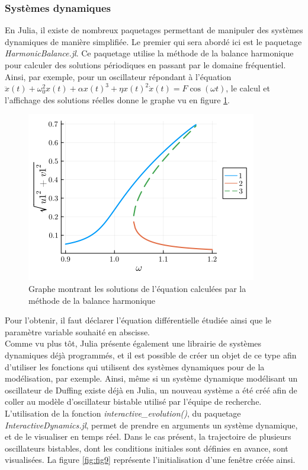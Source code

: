\documentclass[a4paper, french, 12pt, titlepage]{article}
\begin{document}
\subsubsection{Systèmes dynamiques}

En Julia, il existe de nombreux paquetages permettant de manipuler des systèmes dynamiques de manière simplifiée. 
Le premier qui sera abordé ici est le paquetage \emph{HarmonicBalance.jl}.
 Ce paquetage utilise la méthode de la balance harmonique pour calculer des solutions périodiques en passant par le domaine fréquentiel.
  Ainsi, par exemple, pour un oscillateur répondant à l'équation $\ddot x(t) + \omega_0^2 x(t) + \alpha x(t)^3 + \eta x(t)^2 \dot x (t) = F \cos(\omega t)$, le calcul et l'affichage des solutions réelles donne le graphe vu en figure \ref{fig:fig8}.\\

\begin{figure}[H]
\begin{center}
  \includegraphics[width=0.45\linewidth]{harmonicbalance.png}
  \caption{Graphe montrant les solutions de l'équation calculées par la méthode de la balance harmonique}
  \label{fig:fig8}
\end{center}
\end{figure}

Pour l'obtenir, il faut déclarer l'équation différentielle étudiée ainsi que le paramètre variable souhaité en abscisse.\\

Comme vu plus tôt, Julia présente également une librairie de systèmes dynamiques déjà programmés, et il est possible de créer un objet de ce type afin d'utiliser les fonctions qui utilisent des systèmes dynamiques pour de la modélisation, par exemple. 
Ainsi, même si un système dynamique modélisant un oscillateur de Duffing existe déjà en Julia, un nouveau système a été créé afin de coller au modèle d'oscillateur bistable utilisé par l'équipe de recherche. \\

L'utilisation de la fonction \emph{interactive\_evolution()}, du paquetage \emph{InteractiveDynamics.jl}, permet de prendre en arguments un système dynamique, et de le visualiser en temps réel.
 Dans le cas présent, la trajectoire de plusieurs oscillateurs bistables, dont les conditions initiales sont définies en avance, sont visualisées. 
 La figure \ref{fig:fig9} représente l'initialisation d'une fenêtre créée ainsi. \\
\end{document}
